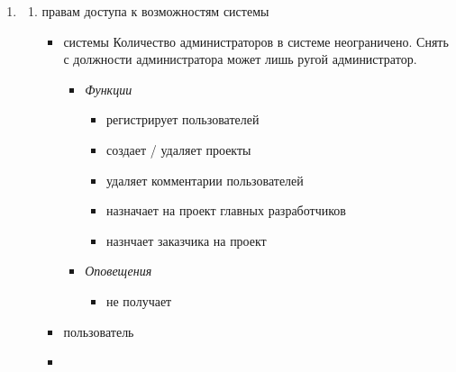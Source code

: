 \documentclass[14pt,a4paper]{extarticle}
\begin{document}
\begin{enumerate}
		\item {}
		\begin{enumerate}
			\item { правам доступа к возможностям системы}
			\begin{itemize}
				\item { системы}
				Количество администраторов в системе неограничено. Снять с должности администратора может лишь ругой администратор.
				\begin{itemize}
					\item {\it Функции}
					\begin{itemize}
						\item регистрирует пользователей
						\item создает / удаляет проекты
						\item удаляет комментарии пользователей
						\item назначает на проект главных разработчиков
						\item назнчает заказчика на проект
					\end{itemize}
					
					\item {\it Оповещения}
					\begin{itemize}
						\item не получает
					\end{itemize}
				\end{itemize}
				
				\item { пользователь}
				
				\item {}
				
			\end{itemize}
			

\end{enumerate}
\end{enumerate}
\end{document}
